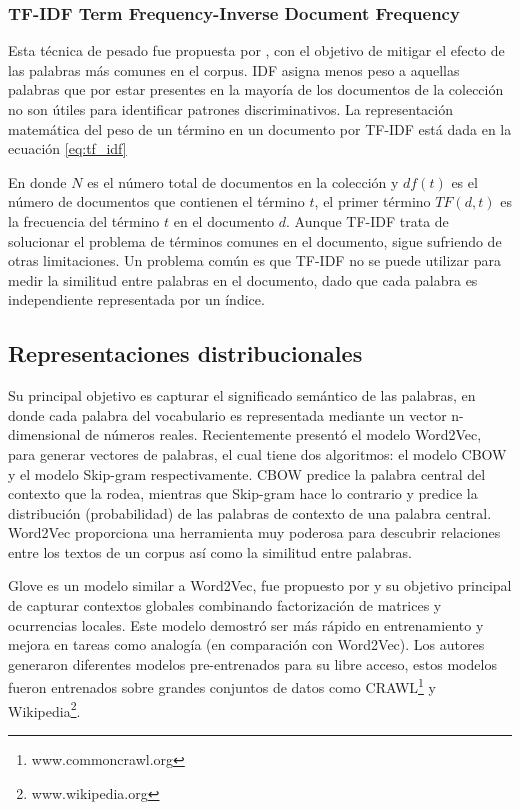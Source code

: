 \subsubsection{TF-IDF Term Frequency-Inverse Document Frequency} Esta técnica de  pesado fue propuesta por \citep{jones1972statistical}, con el objetivo de mitigar el efecto de las palabras más comunes en el corpus. IDF asigna menos peso a aquellas palabras que por estar presentes en la mayoría de los documentos de la colección no son útiles para identificar patrones discriminativos. La representación matemática del peso de un término en un documento por TF-IDF está dada en la ecuación \ref{eq:tf_idf}



En donde $N$ es el número total de documentos en la colección y $df(t)$ es el número de documentos que contienen el término $t$, el primer término $TF(d,t)$ es la frecuencia del término $t$ en el documento $d$. Aunque TF-IDF trata de solucionar el problema de términos comunes en el documento, sigue sufriendo de otras limitaciones. Un problema común es que TF-IDF no se puede utilizar para medir la similitud entre palabras en el documento, dado que cada palabra es independiente representada por un índice.

\subsection{Representaciones distribucionales}
Su principal objetivo es capturar el significado semántico de las palabras, en donde cada palabra del vocabulario es representada mediante un vector n-dimensional de números reales. Recientemente \citep{mikolov2013distributed} presentó el modelo Word2Vec, para generar vectores de palabras, el cual tiene dos algoritmos: el modelo CBOW y el modelo Skip-gram respectivamente. CBOW  predice la palabra central del contexto que la rodea, mientras que Skip-gram hace lo contrario y predice la distribución (probabilidad) de las palabras de contexto de una palabra central. Word2Vec proporciona una herramienta muy poderosa para descubrir relaciones entre los textos de un corpus así como la similitud entre palabras.

Glove es un modelo similar a Word2Vec, fue propuesto por \citep{pennington2014glove} y su objetivo principal de capturar contextos globales combinando factorización de matrices y ocurrencias locales. Este modelo demostró ser más rápido en entrenamiento y mejora en tareas como analogía (en comparación con Word2Vec). Los autores generaron diferentes modelos pre-entrenados para su libre acceso, estos modelos fueron entrenados sobre grandes conjuntos de datos como CRAWL\footnote{www.commoncrawl.org} y Wikipedia\footnote{www.wikipedia.org}.

